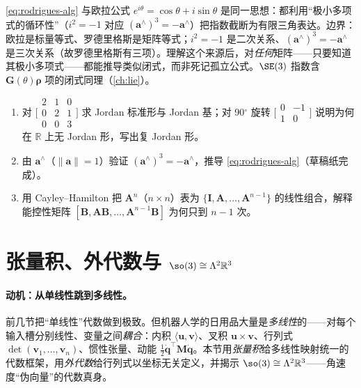 \begin{insight}
\cref{eq:rodrigues-alg} 与欧拉公式 $e^{i\theta}=\cos\theta+i\sin\theta$ 是同一思想：都利用“极小多项式的循环性”（$i^2=-1$ 对应 $(\mathbf{a}^\wedge)^3=-\mathbf{a}^\wedge$）把指数截断为有限三角表达。边界：欧拉是标量等式、罗德里格斯是矩阵等式；$i^2=-1$ 是二次关系、$(\mathbf{a}^\wedge)^3=-\mathbf{a}^\wedge$ 是三次关系（故罗德里格斯有三项）。理解这个来源后，对\emph{任何}矩阵——只要知道其极小多项式——都能推导类似闭式，而非死记孤立公式。$\SE(3)$ 指数含 $\mathbf{G}(\theta)\boldsymbol{\rho}$ 项的闭式同理（\cref{ch:lie}）。
\end{insight}

\begin{practice}
\begin{enumerate}
  \item 对 $\bigl[\begin{smallmatrix}2&1&0\\0&2&1\\0&0&3\end{smallmatrix}\bigr]$ 求 Jordan 标准形与 Jordan 基；对 90$^\circ$ 旋转 $\bigl[\begin{smallmatrix}0&-1\\1&0\end{smallmatrix}\bigr]$ 说明为何在 $\mathbb{R}$ 上无 Jordan 形，写出复 Jordan 形。
  \item 由 $\mathbf{a}^\wedge$（$\|\mathbf{a}\|=1$）验证 $(\mathbf{a}^\wedge)^3=-\mathbf{a}^\wedge$，推导 \cref{eq:rodrigues-alg}（草稿纸完成）。
  \item 用 Cayley--Hamilton 把 $\mathbf{A}^n$（$n\times n$）表为 $\{\mathbf{I},\mathbf{A},\dots,\mathbf{A}^{n-1}\}$ 的线性组合，解释能控性矩阵 $[\mathbf{B},\mathbf{A}\mathbf{B},\dots,\mathbf{A}^{n-1}\mathbf{B}]$ 为何只到 $n-1$ 次。
\end{enumerate}
\end{practice}

\section{张量积、外代数与 \texorpdfstring{$\so(3)\cong\Lambda^2\mathbb{R}^3$}{so(3)=Lambda2R3}}
\label{sec:tensor}

\paragraph{动机：从单线性跳到多线性。}
前几节把“单线性”代数做到极致。但机器人学的日用品大量是\emph{多线性}的——对每个输入槽分别线性、变量之间\emph{耦合}：内积 $\langle\mathbf{u},\mathbf{v}\rangle$、叉积 $\mathbf{u}\times\mathbf{v}$、行列式 $\det(\mathbf{v}_1,\dots,\mathbf{v}_n)$、惯性张量、动能 $\frac12\dot{\mathbf{q}}^\top\mathbf{M}\dot{\mathbf{q}}$。本节用\emph{张量积}给多线性映射统一的代数框架，用\emph{外代数}给行列式以坐标无关定义，并揭示 $\so(3)\cong\Lambda^2\mathbb{R}^3$——角速度“伪向量”的代数真身。

